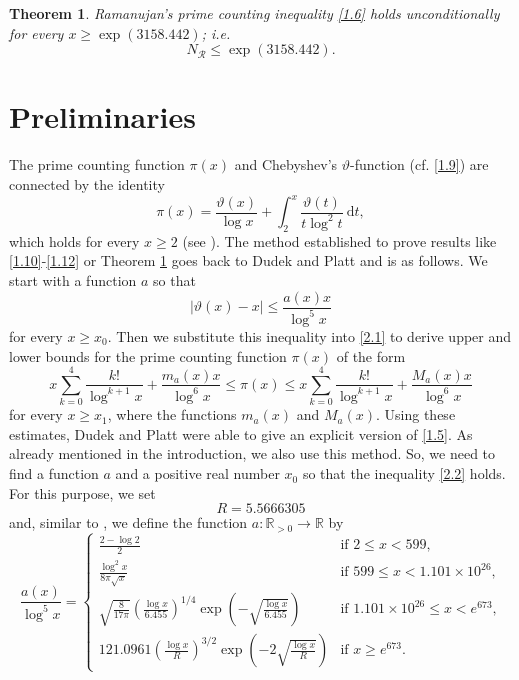 \documentclass[a4paper,12pt]{amsart}
\newtheorem{thm}{Theorem}[section]
\theoremstyle{definition}
\theoremstyle{remark}
\begin{document}
\begin{thm} \label{thm101}
Ramanujan's prime counting inequality \eqref{1.6} holds unconditionally for every $x \geq \exp(3158.442)$; i.e.
\begin{displaymath}
N_{\mathcal{R}} \leq \exp(3158.442).
\end{displaymath}
\end{thm}

\section{Preliminaries}

The prime counting function $\pi(x)$ and Chebyshev's $\vartheta$-function (cf. \eqref{1.9}) are connected by the 
identity
\begin{equation}
\pi(x) = \frac{\vartheta(x)}{\log x} + \int_{2}^{x}{\frac{\vartheta(t)}{t \log^{2} t}\ \text{d}t}, \tag{2.1} \label{2.1}
\end{equation}
which holds for every $x \geq 2$ (see \cite[Theorem 4.3]{ap}). The method established to prove results like \eqref{1.10}-\eqref{1.12} or Theorem \ref{thm101} goes back to Dudek and Platt \cite{dudekplatt} and is as follows. We start with a function $a$ so that
\begin{equation}
|\vartheta(x)-x| \leq \frac{a(x)x}{\log^5x} \tag{2.2} \label{2.2}
\end{equation}
for every $x \geq x_0$. Then we substitute this inequality into \eqref{2.1} to derive upper and lower bounds for the prime counting function $\pi(x)$ of the form
\begin{equation}
x\sum_{k=0}^4 \frac{k!}{\log^{k+1}x} + \frac{m_a(x)x}{\log^6x} \leq \pi(x) \leq x\sum_{k=0}^4 \frac{k!}{\log^{k+1}x} + \frac{M_a(x)x}{\log^6x} \tag{2.3} \label{2.3}
\end{equation}
for every $x \geq x_1$, where the functions $m_a(x)$ and $M_a(x)$. Using these estimates, Dudek and Platt were able to give an
explicit version of \eqref{1.5}. As already mentioned in the introduction, we also use this method. So, we need to find a function $a$ and a positive real number $x_0$ so that the inequality \eqref{2.2} holds. For this purpose, we set
\begin{displaymath}
R = 5.5666305
\end{displaymath}
and, similar to \cite[p.]{plattt}, we define the function $a: \mathbb{R}_{>0} \to \mathbb{R}$ by
\begin{displaymath}
\frac{a(x)}{\log^5x} = 
\begin{cases}
\displaystyle \frac{2 - \log2}{2} & \text{if $2 \leq x < 599$,} \\
\displaystyle\frac{\log^2x}{8\pi\sqrt{x}} & \text{if $599 \leq x < 1.101 \times 10^{26}$,} \\
\displaystyle \sqrt{\frac{8}{17\pi}} \left( \frac{\log x}{6.455} \right)^{1/4} \exp \left( - \sqrt{\frac{\log x}{6.455}} \right) & \text{if $1.101 \times 10^{26} \leq x < e^{673}$,} \\
\displaystyle 121.0961 \left( \frac{\log x}{R} \right)^{3/2} \exp \left( - 2 \sqrt{\frac{\log x}{R}} \right) & \text{if $x \geq e^{673}$.}
\end{cases}
\end{displaymath}
\end{document}
